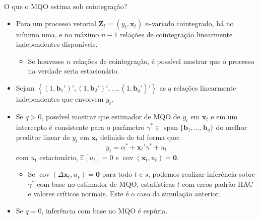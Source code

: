 \documentclass[11pt]{beamer}
\begin{document}
\begin{frame}{O que o MQO estima sob cointegração?}
\begin{itemize}
	\item Para um processo vetorial $\boldsymbol{Z}_t = (y_t,\boldsymbol{x}_t)$ $n$-variado cointegrado, há no mínimo uma, e no máximo $n-1$ relações de cointegração linearmente independentes disponíveis.
	\begin{itemize}
		\item Se houvesse $n$ relações de cointegração, é possível mostrar que o processo na verdade seria estacionário.
	\end{itemize}
	\item Sejam $\left\{(1,
		\boldsymbol{b}_1'
	)', 
(1,
\boldsymbol{b}_2'
)',\ldots, (1,
\boldsymbol{b}_q'
)'\right\}$ as $q$ relações linearmente independentes que envolvem $y_t$.
		\item Se $q > 0$, possível mostrar que estimador de MQO de $y_t$ em  $\boldsymbol{x}_t$ e em um intercepto é consistente para o parâmetro $\gamma^* \in \operatorname{span} \{\boldsymbol{b}_1,\ldots, \boldsymbol{b}_q\}$ do {\color{blue}melhor preditor linear de $y_t$ em $\boldsymbol{x}_t$} definido de tal forma que:
		$$y_t = \alpha^* + \boldsymbol{x}_t '\gamma^* + u_t\, $$
		com $u_t$ estacionário, $\mathbb{E}[u_t] = 0$ e $\operatorname{cov}(\boldsymbol{x}_t,u_t) = \boldsymbol{0}$.
		\begin{itemize}
			\item Se $\operatorname{cov}(\Delta \boldsymbol{x}_t , u_s) = \boldsymbol{0}$ para todo $t$ e $s$, podemos realizar inferência sobre  $\gamma^*$ com base no estimador de MQO, estatísticas $t$ com erros padrão HAC e valores críticos normais. Este é o caso da simulação anterior.
		\end{itemize}
		\item Se $q=0$, inferência com base no MQO é espúria.
\end{itemize}
\end{frame}
\end{document}
